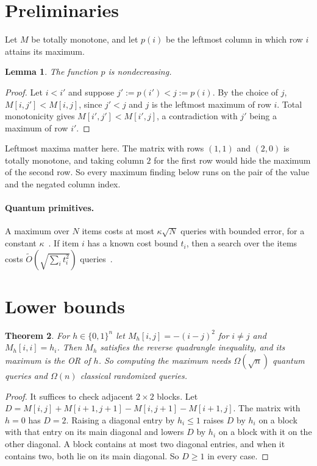 \documentclass[11pt]{article}
\newtheorem{theorem}{Theorem}[section]
\newtheorem{lemma}[theorem]{Lemma}
\theoremstyle{definition}
\theoremstyle{remark}
\newcommand{\Ot}{\tilde O}
\begin{document}
\section{Preliminaries}

Let $M$ be totally monotone, and let $p(i)$ be the leftmost column in which row $i$ attains its maximum.

\begin{lemma}\label{lem:mono}
The function $p$ is nondecreasing.
\end{lemma}
\begin{proof}
Let $i<i'$ and suppose $j':=p(i')<j:=p(i)$. By the choice of $j$, $M[i,j']<M[i,j]$, since $j'<j$ and $j$ is the leftmost maximum of row $i$. Total monotonicity gives $M[i',j']<M[i',j]$, a contradiction with $j'$ being a maximum of row $i'$.
\end{proof}

Leftmost maxima matter here. The matrix with rows $(1,1)$ and $(2,0)$ is totally monotone, and taking column $2$ for the first row would hide the maximum of the second row. So every maximum finding below runs on the pair of the value and the negated column index.

\paragraph{Quantum primitives.} A maximum over $N$ items costs at most $\kappa\sqrt N$ queries with bounded error, for a constant $\kappa$~\cite{DH96}. If item $i$ has a known cost bound $t_i$, then a search over the items costs $\Ot(\sqrt{\sum_i t_i^2})$ queries~\cite{Amb10}.

\section{Lower bounds}\label{sec:lower}

\begin{theorem}\label{thm:lower}
For $h\in\{0,1\}^n$ let $M_h[i,j]=-(i-j)^2$ for $i\ne j$ and $M_h[i,i]=h_i$. Then $M_h$ satisfies the reverse quadrangle inequality, and its maximum is the OR of $h$. So computing the maximum needs $\Omega(\sqrt n)$ quantum queries and $\Omega(n)$ classical randomized queries.
\end{theorem}
\begin{proof}
It suffices to check adjacent $2\times 2$ blocks. Let $D=M[i,j]+M[i+1,j+1]-M[i,j+1]-M[i+1,j]$. The matrix with $h=0$ has $D=2$. Raising a diagonal entry by $h_i\le 1$ raises $D$ by $h_i$ on a block with that entry on its main diagonal and lowers $D$ by $h_i$ on a block with it on the other diagonal. A block contains at most two diagonal entries, and when it contains two, both lie on its main diagonal. So $D\ge 1$ in every case.
\end{proof}
\end{document}
